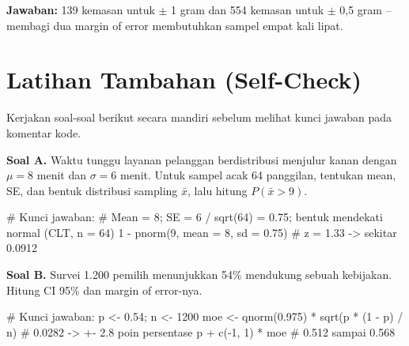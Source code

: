 \documentclass[
  indonesian,
  letterpaper,
]{book}
\newenvironment{Shaded}{\begin{snugshade}}{\end{snugshade}}
\newcommand{\AttributeTok}[1]{\textcolor[rgb]{0.40,0.45,0.13}{#1}}
\newcommand{\CommentTok}[1]{\textcolor[rgb]{0.37,0.37,0.37}{#1}}
\newcommand{\DecValTok}[1]{\textcolor[rgb]{0.68,0.00,0.00}{#1}}
\newcommand{\FloatTok}[1]{\textcolor[rgb]{0.68,0.00,0.00}{#1}}
\newcommand{\FunctionTok}[1]{\textcolor[rgb]{0.28,0.35,0.67}{#1}}
\newcommand{\NormalTok}[1]{\textcolor[rgb]{0.00,0.23,0.31}{#1}}
\newcommand{\OtherTok}[1]{\textcolor[rgb]{0.00,0.23,0.31}{#1}}
\newcommand{\SpecialCharTok}[1]{\textcolor[rgb]{0.37,0.37,0.37}{#1}}
\begin{document}
\textbf{Jawaban:} 139 kemasan untuk \(\pm\) 1 gram dan 554 kemasan untuk
\(\pm\) 0,5 gram -- membagi dua margin of error membutuhkan sampel empat
kali lipat.

\section{Latihan Tambahan
(Self-Check)}\label{latihan-tambahan-self-check}

Kerjakan soal-soal berikut secara mandiri sebelum melihat kunci jawaban
pada komentar kode.

\textbf{Soal A.} Waktu tunggu layanan pelanggan berdistribusi menjulur
kanan dengan \(\mu = 8\) menit dan \(\sigma = 6\) menit. Untuk sampel
acak 64 panggilan, tentukan mean, SE, dan bentuk distribusi sampling
\(\bar{x}\), lalu hitung \(P(\bar{x} > 9)\).

\begin{Shaded}
\begin{Highlighting}[]
\CommentTok{\# Kunci jawaban:}
\CommentTok{\# Mean = 8; SE = 6 / sqrt(64) = 0.75; bentuk mendekati normal (CLT, n = 64)}
\DecValTok{1} \SpecialCharTok{{-}} \FunctionTok{pnorm}\NormalTok{(}\DecValTok{9}\NormalTok{, }\AttributeTok{mean =} \DecValTok{8}\NormalTok{, }\AttributeTok{sd =} \FloatTok{0.75}\NormalTok{)    }\CommentTok{\# z = 1.33 {-}\textgreater{} sekitar 0.0912}
\end{Highlighting}
\end{Shaded}

\textbf{Soal B.} Survei 1.200 pemilih menunjukkan 54\% mendukung sebuah
kebijakan. Hitung CI 95\% dan margin of error-nya.

\begin{Shaded}
\begin{Highlighting}[]
\CommentTok{\# Kunci jawaban:}
\NormalTok{p }\OtherTok{\textless{}{-}} \FloatTok{0.54}\NormalTok{; n }\OtherTok{\textless{}{-}} \DecValTok{1200}
\NormalTok{moe }\OtherTok{\textless{}{-}} \FunctionTok{qnorm}\NormalTok{(}\FloatTok{0.975}\NormalTok{) }\SpecialCharTok{*} \FunctionTok{sqrt}\NormalTok{(p }\SpecialCharTok{*}\NormalTok{ (}\DecValTok{1} \SpecialCharTok{{-}}\NormalTok{ p) }\SpecialCharTok{/}\NormalTok{ n)   }\CommentTok{\# 0.0282 {-}\textgreater{} +{-} 2.8 poin persentase}
\NormalTok{p }\SpecialCharTok{+} \FunctionTok{c}\NormalTok{(}\SpecialCharTok{{-}}\DecValTok{1}\NormalTok{, }\DecValTok{1}\NormalTok{) }\SpecialCharTok{*}\NormalTok{ moe                            }\CommentTok{\# 0.512 sampai 0.568}
\end{Highlighting}
\end{Shaded}
\end{document}
